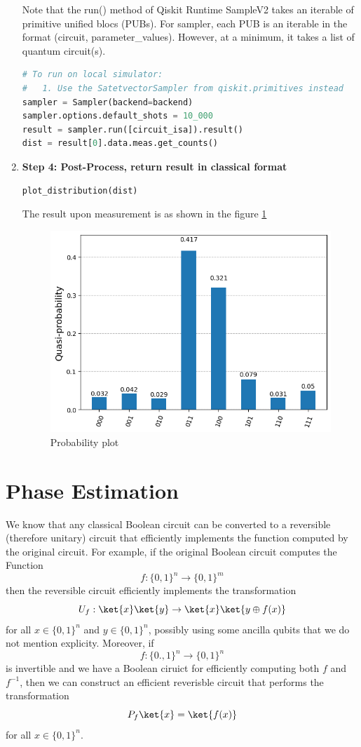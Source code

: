 \documentclass[12pt, oneside]{book}
\theoremstyle{definition}
\theoremstyle{definition}
\theoremstyle{remark}
\begin{document}
\begin{enumerate}
Note that the run() method of Qiskit Runtime SampleV2 takes an iterable of primitive unified blocs (PUBs). For sampler, each PUB is an iterable in the format (circuit, parameter\_values). However, at a minimum, it takes a list of quantum circuit(s).
\begin{lstlisting}[language=Python]
# To run on local simulator:
#   1. Use the SatetvectorSampler from qiskit.primitives instead
sampler = Sampler(backend=backend)
sampler.options.default_shots = 10_000
result = sampler.run([circuit_isa]).result()
dist = result[0].data.meas.get_counts()    
\end{lstlisting}
\item \textbf{Step 4: Post-Process, return result in classical format}\\
\begin{lstlisting}[language=Python]
plot_distribution(dist)
\end{lstlisting}
The result upon measurement is as shown in the figure \ref{fig:grover_results}
\begin{figure}[H]
    \centering
    \includegraphics[width=0.7\linewidth]{../images/grover_result.png}
    \caption{Probability plot}
    \label{fig:grover_results}
\end{figure}
\end{enumerate}






\chapter{Phase Estimation}
We know that any classical Boolean circuit can be converted to a reversible (therefore unitary) circuit that efficiently implements the function computed by the original
circuit. For example, if the original Boolean circuit computes the Function
\[
    f:\{0,1\}^n \rightarrow \{0,1\}^m
\]
then the reversible circuit efficiently implements the transformation
\[
    U_f:\ket{x}\ket{y} \rightarrow \ket{x}\ket{y\oplus f(x)}
\]
for all $x \in \{0,1\}^n$ and $y \in \{0,1\}^n$, possibly using some ancilla qubits that we do not
mention explicity. Moreover, if 
\[
    f:\{0.,1\}^n\rightarrow \{0,1\}^n 
\]
is invertible and we have a Boolean ciruict for efficiently computing both $f$ and $f^{-1}$, then we can construct an efficient reverisble circuit that performs the transformation
\[
P_f\ket{x}=\ket{f(x)}
\]
for all $x \in \{0,1\}^n$. 
\end{document}
